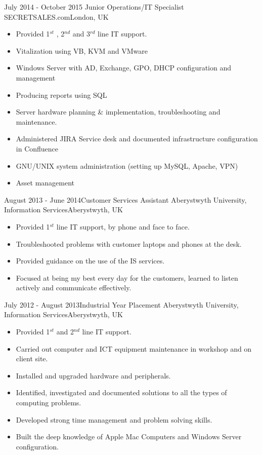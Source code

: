 \documentclass[11pt,a4paper]{moderncv}
\begin{document}
\cventry
	{July 2014 - October 2015 }{Junior Operations/IT Specialist}
	{SECRETSALES.com}{London, UK}
	{}{
        \begin{itemize}
            \item Provided 1$^{st}$ , 2$^{nd}$ and 3$^{rd}$ line IT support.
            \item Vitalization using VB, KVM and VMware
            \item Windows Server with AD, Exchange, GPO, DHCP configuration and management
            \item Producing reports using SQL
            \item Server hardware planning \& implementation, troubleshooting and maintenance.
            \item Administered JIRA Service desk and documented infrastructure configuration in Confluence
            \item GNU/UNIX system administration (setting up MySQL, Apache, VPN)
            \item Asset management
        \end{itemize}
    }
    
\cventry
	{August 2013 - June 2014}{Customer Services Assistant}
	{Aberystwyth University, Information Services}{Aberystwyth, UK}
	{}{
        \begin{itemize}
            \item Provided 1$^{st}$ line IT support, by phone and face to face.
            \item Troubleshooted problems with customer laptops and phones at the desk.
            \item Provided guidance on the use of the IS services.
            \item Focused at being my best every day for the customers, learned to listen actively and communicate effectively.
        \end{itemize}
    }
	
\cventry
	{July 2012 - August 2013}{Industrial Year Placement}
	{Aberystwyth University, Information Services}{Aberystwyth, UK}
	{}{
        \begin{itemize}
            \item Provided 1$^{st}$ and 2$^{nd}$ line IT support.
            \item Carried out computer and ICT equipment maintenance in workshop and on client site.
            \item Installed and upgraded hardware and peripherals.
            \item Identified, investigated and documented solutions to all the types of computing problems.
            \item Developed strong time management and problem solving skills.
            \item Built the deep knowledge of Apple Mac Computers and Windows Server configuration. 
        \end{itemize}
    }
    
\end{document}
